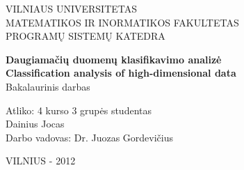 \begin{titlepage}

\begin{center}
VILNIAUS UNIVERSITETAS\\
MATEMATIKOS IR INORMATIKOS FAKULTETAS\\
PROGRAMŲ SISTEMŲ KATEDRA\\
\vspace{150pt}

\huge \textbf{Daugiamačių duomenų klasifikavimo analizė\\}
\vspace{20pt}
\large\textbf{Classification analysis of high-dimensional data\\}
\vspace{20pt}
\small Bakalaurinis darbas\\
\vspace{40pt}
\end{center} 


\begin{flushleft}
Atliko:\hspace{65pt} 
4 kurso 3 grupės studentas\\
\hspace{100pt} Dainius Jocas\hspace{100pt} \\
\vspace{10pt}
Darbo vadovas:\hspace{23pt} Dr. Juozas Gordevičius \hspace{39pt}
\\
\vspace{140pt}
\end{flushleft}

\begin{center}
VILNIUS - 2012
\end{center}

\end{titlepage}